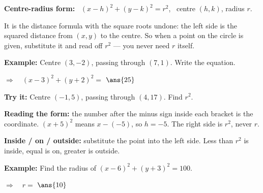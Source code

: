 \documentclass[12pt]{article}
\begin{document}


\begin{formulabox}
\textbf{Centre-radius form:} \ $(x-h)^2 + (y-k)^2 = r^2$, \ centre $(h, k)$, radius $r$.\par
It is the distance formula with the square roots undone: the left side is the squared distance from $(x, y)$ to the centre. So when a point on the circle is given, substitute it and read off $r^2$ --- you never need $r$ itself.
\end{formulabox}

\begin{examplebox}
\textbf{Example:} \quad Centre $(3, -2)$, passing through $(7, 1)$. Write the equation.

$\Rightarrow\quad (x-3)^2 + (y+2)^2 = $ $\ans{25}$
\end{examplebox}

\begin{tryitbox}
\textbf{Try it:} \quad Centre $(-1, 5)$, passing through $(4, 17)$. Find $r^2$.\\[2pt]
\end{tryitbox}


\begin{formulabox}
\textbf{Reading the form:} the number after the minus sign inside each bracket is the coordinate. $(x + 5)^2$ means $x - (-5)$, so $h = -5$. The right side is $r^2$, never $r$.\par
\textbf{Inside / on / outside:} substitute the point into the left side. Less than $r^2$ is inside, equal is on, greater is outside.
\end{formulabox}

\begin{examplebox}
\textbf{Example:} \quad Find the radius of $(x-6)^2 + (y+3)^2 = 100$.

$\Rightarrow\quad r = $ $\ans{10}$
\end{examplebox}
\end{document}
